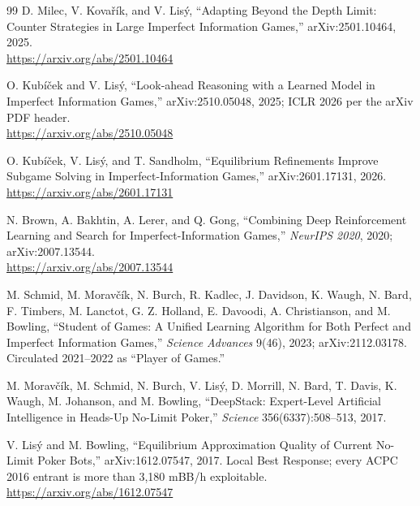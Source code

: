 \begin{thebibliography}{99}
D. Milec, V. Kova\v{r}\'ik, and V. Lis\'y, ``Adapting Beyond the Depth Limit:
Counter Strategies in Large Imperfect Information Games,'' arXiv:2501.10464,
2025.\\
\url{https://arxiv.org/abs/2501.10464}

O. Kub\'i\v{c}ek and V. Lis\'y, ``Look-ahead Reasoning with a Learned Model in
Imperfect Information Games,'' arXiv:2510.05048, 2025; ICLR 2026 per the arXiv
PDF header.\\
\url{https://arxiv.org/abs/2510.05048}

O. Kub\'i\v{c}ek, V. Lis\'y, and T. Sandholm, ``Equilibrium Refinements Improve
Subgame Solving in Imperfect-Information Games,'' arXiv:2601.17131, 2026.\\
\url{https://arxiv.org/abs/2601.17131}


N. Brown, A. Bakhtin, A. Lerer, and Q. Gong, ``Combining Deep Reinforcement
Learning and Search for Imperfect-Information Games,'' \emph{NeurIPS 2020},
2020; arXiv:2007.13544.\\
\url{https://arxiv.org/abs/2007.13544}

M. Schmid, M. Morav\v{c}\'ik, N. Burch, R. Kadlec, J. Davidson, K. Waugh,
N. Bard, F. Timbers, M. Lanctot, G. Z. Holland, E. Davoodi, A. Christianson, and
M. Bowling, ``Student of Games: A Unified Learning Algorithm for Both Perfect
and Imperfect Information Games,'' \emph{Science Advances} 9(46), 2023;
arXiv:2112.03178. Circulated 2021--2022 as ``Player of Games.''

M. Morav\v{c}\'ik, M. Schmid, N. Burch, V. Lis\'y, D. Morrill, N. Bard,
T. Davis, K. Waugh, M. Johanson, and M. Bowling, ``DeepStack: Expert-Level
Artificial Intelligence in Heads-Up No-Limit Poker,'' \emph{Science}
356(6337):508--513, 2017.

V. Lis\'y and M. Bowling, ``Equilibrium Approximation Quality of Current
No-Limit Poker Bots,'' arXiv:1612.07547, 2017. Local Best Response; every ACPC
2016 entrant is more than 3,180 mBB/h exploitable.\\
\url{https://arxiv.org/abs/1612.07547}



\end{thebibliography}
